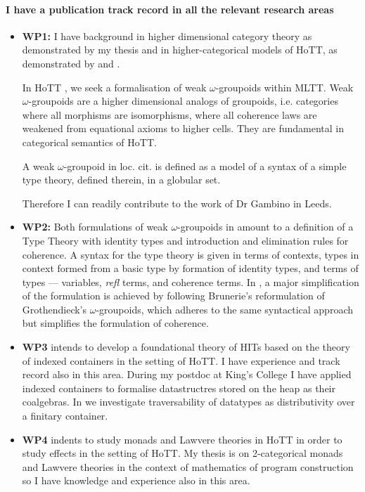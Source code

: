 \documentclass[a4paper]{article}
\newcommand{\mltt}{MLTT}
\begin{document}
\paragraph{I have a publication track record in all the relevant research areas}
\begin{itemize}
\item {\bf WP1:} I have background in higher dimensional category
  theory as demonstrated by my thesis and in higher-categorical models
  of HoTT, as demonstrated by  and
  .

  In HoTT , we seek
  a formalisation of weak $\omega$-groupoids within \mltt. Weak
  $\omega$-groupoids are a higher dimensional analogs of groupoids,
  i.e. categories where all morphisms are isomorphisms, where all
  coherence laws are weakened from equational axioms to higher
  cells. They are fundamental in categorical semantics of HoTT.

  A weak $\omega$-groupoid in loc. cit. is defined as a model of a syntax of a
  simple type theory, defined therein, in a globular set. 

  Therefore I can readily contribute to the work of Dr Gambino in Leeds.

\item {\bf WP2:} Both formulations of weak $\omega$-groupoids in
   amount to a
  definition of a Type Theory with identity types and introduction and
  elimination rules for coherence. A syntax for the type theory is
  given in terms of contexts, types in context formed from a basic
  type by formation of identity types, and terms of types ---
  variables, \emph{refl} terms, and coherence terms. In
  , a major simplification of the
  formulation is achieved by following Brunerie's reformulation of
  Grothendieck's $\omega$-groupoids, which adheres to the same
  syntactical approach but simplifies the formulation of coherence.


\item {\bf WP3} intends to develop a foundational theory of HITs based
  on the theory of indexed containers in the setting of HoTT. I have
  experience and track record also in this area.  During my postdoc at King's
  College I have applied indexed containers to formalise datastructres
  stored on the heap as their coalgebras. In
   we investigate traversability of
  datatypes as distributivity over a finitary container.

\item {\bf WP4} indents to study monads and Lawvere theories in HoTT
  in order to study effects in the setting of HoTT.  My thesis
   is on 2-categorical monads and Lawvere
  theories in the context of mathematics of program construction so I
  have knowledge and experience also in this area.
\end{itemize}
\end{document}
